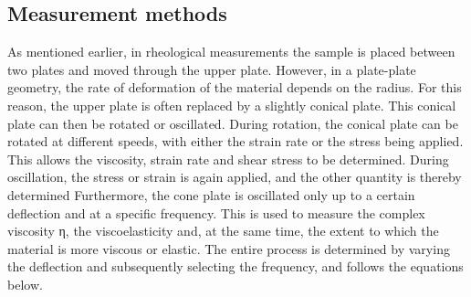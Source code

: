 \documentclass[10pt,a4paper,ngerman]{scrartcl}
\begin{document}
	\subsection{Measurement methods}
		As mentioned earlier, in rheological measurements the sample is placed between two plates and moved through the upper plate. However, in a plate-plate 
		geometry, the rate of deformation of the material depends on the radius. For this reason, the upper plate is often replaced by a slightly conical plate. This 
		conical plate can then be rotated or oscillated. During rotation, the conical plate can be rotated at different speeds, with either the strain rate or the 
		stress being applied. This allows the viscosity, strain rate and shear stress to be determined. During oscillation, the stress or strain is again applied, and the 
		other quantity is thereby determined Furthermore, the cone plate is oscillated only up to a certain deflection and at a specific frequency. This is used to 
		measure the complex viscosity η, the viscoelasticity and, at the same time, the extent to which the material is more viscous or elastic. The entire process is 
		determined by varying the deflection and subsequently selecting the frequency, and follows the equations below.\\
	
\end{document}
